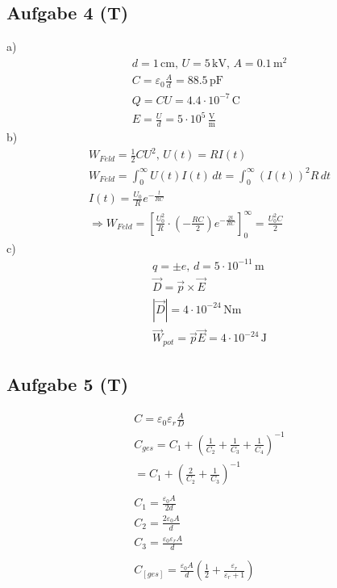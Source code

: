 \documentclass{article}
\begin{document}
\subsection*{Aufgabe 4 (T)}
a)\begin{eqnarray*}
    d=1\,\mathrm{cm},\,U=5\,\mathrm{kV},\,A=0.1\,\mathrm{m^2}\\
    C=\varepsilon_0\frac{A}{d}=88.5\,\mathrm{pF}\\
    Q=CU=4.4\cdot 10^{-7}\,\mathrm{C}\\
    E=\frac{U}{d}=5\cdot 10^5\,\mathrm{\frac{V}{m}}
\end{eqnarray*}
b)\begin{eqnarray*}
    W_{Feld}=\frac{1}{2}CU^2,\,U(t)=RI(t)\\
    W_{Feld}=\int_{0}^{\infty}U(t)I(t)\,dt=\int_{0}^{\infty}(I(t))^2R\,dt\\
    I(t)=\frac{U_0}{R}e^{-\frac{t}{RC}}\\
    \Rightarrow W_{Feld} = \left[\frac{U_0^2}{R}\cdot\left(-\frac{RC}{2}\right)e^{-\frac{2t}{RC}}\right]_0^{\infty}=\frac{U_0^2C}{2}
\end{eqnarray*}
c)\begin{eqnarray*}
    q=\pm e,\,d=5\cdot 10^{-11}\,\mathrm{m}\\
    \vec{D}=\vec{p}\times \vec{E}\\
    |\vec{D}| = 4\cdot 10^{-24}\,\mathrm{Nm}\\
    \vec{W}_{pot}=\vec{p}\vec{E}=4\cdot 10^{-24}\,\mathrm{J}
\end{eqnarray*}

\subsection*{Aufgabe 5 (T)}
\begin{eqnarray*}
    C=\varepsilon_0\varepsilon_r\frac{A}{D}\\
    C_{ges}=C_1+\left(\frac{1}{C_2}+\frac{1}{C_3}+\frac{1}{C_4}\right)^{-1}\\
    =C_1+\left(\frac{2}{C_2}+\frac{1}{C_3}\right)^{-1}\\\\
    C_1 =\frac{\varepsilon_0 A}{2d}\\
    C_2 =\frac{2\varepsilon_0 A}{d}\\
    C_3 =\frac{\varepsilon_0\varepsilon_rA}{d}\\\\
    C_[ges]=\frac{\varepsilon_0A}{d}\left(\frac{1}{2}+\frac{\varepsilon_r}{\varepsilon_r+1}\right)
\end{eqnarray*}
\end{document}
